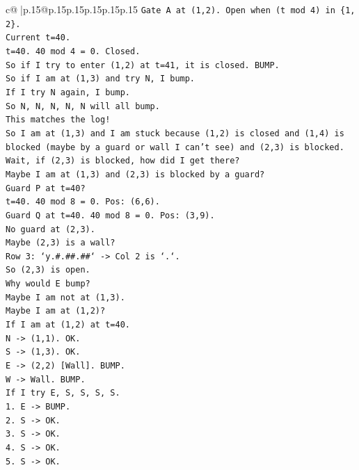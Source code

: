 \documentclass{article}
\begin{document}
{\begin{supertabular}{c@{$\;$}|p{.15\linewidth}@{}p{.15\linewidth}p{.15\linewidth}p{.15\linewidth}p{.15\linewidth}p{.15\linewidth}}
{{{\texttt{Gate A at (1,2). Open when (t mod 4) in \{1, 2\}.} \\
\texttt{Current t=40.} \\
\texttt{t=40. 40 mod 4 = 0. Closed.} \\
\texttt{So if I try to enter (1,2) at t=41, it is closed. BUMP.} \\
\texttt{So if I am at (1,3) and try N, I bump.} \\
\texttt{If I try N again, I bump.} \\
\texttt{So N, N, N, N, N will all bump.} \\
\texttt{This matches the log!} \\
\texttt{So I am at (1,3) and I am stuck because (1,2) is closed and (1,4) is blocked (maybe by a guard or wall I can't see) and (2,3) is blocked.} \\
\texttt{Wait, if (2,3) is blocked, how did I get there?} \\
\texttt{Maybe I am at (1,3) and (2,3) is blocked by a guard?} \\
\texttt{Guard P at t=40?} \\
\texttt{t=40. 40 mod 8 = 0. Pos: (6,6).} \\
\texttt{Guard Q at t=40. 40 mod 8 = 0. Pos: (3,9).} \\
\texttt{No guard at (2,3).} \\
\texttt{Maybe (2,3) is a wall?} \\
\texttt{Row 3: `y.\#.\#\#.\#\#` {-}> Col 2 is `.`.} \\
\texttt{So (2,3) is open.} \\
\texttt{Why would E bump?} \\
\texttt{Maybe I am not at (1,3).} \\
\texttt{Maybe I am at (1,2)?} \\
\texttt{If I am at (1,2) at t=40.} \\
\texttt{N {-}> (1,1). OK.} \\
\texttt{S {-}> (1,3). OK.} \\
\texttt{E {-}> (2,2) {[}Wall{]}. BUMP.} \\
\texttt{W {-}> Wall. BUMP.} \\
\texttt{If I try E, S, S, S, S.} \\
\texttt{1. E {-}> BUMP.} \\
\texttt{2. S {-}> OK.} \\
\texttt{3. S {-}> OK.} \\
\texttt{4. S {-}> OK.} \\
\texttt{5. S {-}> OK.} \\
}}}
\end{supertabular}}
\end{document}
